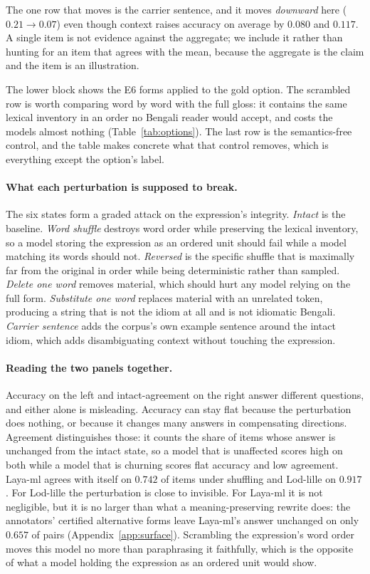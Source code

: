 \documentclass[11pt]{article}
\begin{document}
The one row that moves is the carrier sentence, and it moves \emph{downward} here
($0.21 \rightarrow 0.07$) even though context raises accuracy on average by
$0.080$ and $0.117$. A single item is not evidence against the aggregate; we
include it rather than hunting for an item that agrees with the mean, because the
aggregate is the claim and the item is an illustration.

The lower block shows the E6 forms applied to the gold option. The scrambled row
is worth comparing word by word with the full gloss: it contains the same lexical
inventory in an order no Bengali reader would accept, and costs the models almost
nothing (Table~\ref{tab:options}). The last row is the semantics-free control, and
the table makes concrete what that control removes, which is everything except the
option's label.

\paragraph{What each perturbation is supposed to break.} The six states form a
graded attack on the expression's integrity. \emph{Intact} is the baseline.
\emph{Word shuffle} destroys word order while preserving the lexical inventory,
so a model storing the expression as an ordered unit should fail while a model
matching its words should not. \emph{Reversed} is the specific shuffle that is
maximally far from the original in order while being deterministic rather than
sampled. \emph{Delete one word} removes material, which should hurt any model
relying on the full form. \emph{Substitute one word} replaces material with an
unrelated token, producing a string that is not the idiom at all and is not
idiomatic Bengali. \emph{Carrier sentence} adds the corpus's own example sentence
around the intact idiom, which adds disambiguating context without touching the
expression.

\paragraph{Reading the two panels together.} Accuracy on the left and
intact-agreement on the right answer different questions, and either alone is
misleading. Accuracy can stay flat because the perturbation does nothing, or
because it changes many answers in compensating directions. Agreement
distinguishes those: it counts the share of items whose answer is unchanged from
the intact state, so a model that is unaffected scores high on both while a model
that is churning scores flat accuracy and low agreement. Laya-ml agrees with
itself on $0.742$ of items under shuffling and Lod-lille on $0.917$. For Lod-lille
the perturbation is close to invisible. For Laya-ml it is not negligible, but it is
no larger than what a meaning-preserving rewrite does: the annotators' certified
alternative forms leave Laya-ml's answer unchanged on only $0.657$ of pairs
(Appendix~\ref{app:surface}). Scrambling the expression's word order moves this
model no more than paraphrasing it faithfully, which is the opposite of what a
model holding the expression as an ordered unit would show.
\end{document}

